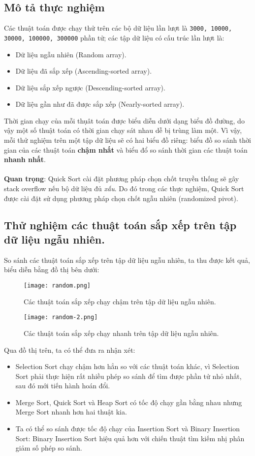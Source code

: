 \documentclass[]{article}
\begin{document}
\subsection{Mô tả thực nghiệm}
Các thuật toán được chạy thử trên các bộ dữ liệu lần lượt là \texttt{3000, 10000, 30000, 100000, 300000} phần tử; các tập dữ liệu có cấu trúc lần lượt là:
\begin{itemize}
\item Dữ liệu ngẫu nhiên (Random array).
\item Dữ liệu đã sắp xếp (Ascending-sorted array).
\item Dữ liệu sắp xếp ngược (Descending-sorted array).
\item Dữ liệu gần như đã được sắp xếp (Nearly-sorted array).
\end{itemize}
Thời gian chạy của mỗi thụât toán được biểu diễn dưới dạng biểu đồ đường, do vậy một số thuật toán có thời gian chạy sát nhau dễ bị trùng làm một. Vì vậy, mỗi thử nghiệm trên một tập dữ liệu sẽ có hai biểu đồ riêng: biểu đồ so sánh thời gian của các thuật toán \textbf{chậm nhất} và biểu đổ so sánh thời gian các thuật toán \textbf{nhanh nhất}.
\\\\
\textbf{Quan trọng}: Quick Sort cài đặt phương pháp chọn chốt truyền thống sẽ gây stack overflow nếu bộ dữ liệu đủ \textit{xấu}. Do đó trong các thực nghiệm, Quick Sort được cài đặt sử dụng phương pháp chọn chốt ngẫu nhiên (randomized pivot).

\subsection{Thử nghiệm các thuật toán sắp xếp trên tập dữ liệu ngẫu nhiên.}
So sánh các thuật toán sắp xếp trên tập dữ liệu ngẫu nhiên, ta thu được kết quả, biểu diễn bằng đồ thị bên dưới:
\begin{figure}[H]
\centering
\texttt{[image: random.png]}
\caption{Các thuật toán sắp xếp chạy chậm trên tập dữ liệu ngẫu nhiên.}
\end{figure}
\begin{figure}[H]
\centering
\texttt{[image: random-2.png]}
\caption{Các thuật toán sắp xếp chạy nhanh trên tập dữ liệu ngẫu nhiên.}
\end{figure}
Qua đồ thị trên, ta có thể đưa ra nhận xét:
\begin{itemize}
\item Selection Sort chạy chậm hơn hẳn so với các thuật toán khác, vì Selection Sort phải thực hiện rất nhiều phép so sánh để tìm được phần tử nhỏ nhất, sau đó mới tiến hành hoán đổi.
\item Merge Sort, Quick Sort và Heap Sort có tốc độ chạy gần bằng nhau nhưng Merge Sort nhanh hơn hai thuật kia.
\item Ta có thể so sánh được tốc độ chạy của Insertion Sort và Binary Insertion Sort: Binary Insertion Sort hiệu quả hơn với chiến thuật tìm kiếm nhị phân giảm số phép so sánh.
\end{itemize}
\end{document}
